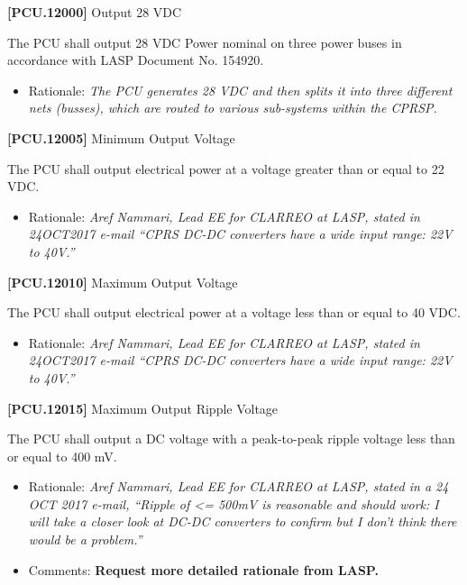 \textbf{[PCU.12000]} Output 28 \gls{VDC}

The \gls{PCU} shall output 28 \gls{VDC} Power nominal on three power buses in accordance with \gls{LASP} Document No. 154920.

\begin{itemize}
\item{} Rationale: \emph{The PCU generates 28 VDC and then splits it into three different nets (busses), which are routed to various sub-systems within the CPRSP.}

\end{itemize}

\textbf{[PCU.12005]} Minimum Output Voltage

The \gls{PCU} shall output electrical power at a voltage greater than or equal to 22 \gls{VDC}.

\begin{itemize}
\item{} Rationale: \emph{Aref Nammari, Lead EE for CLARREO at LASP, stated in 24OCT2017 e-mail ``CPRS DC-DC converters have a wide input range: 22V to 40V.''}

\end{itemize}

\textbf{[PCU.12010]} Maximum Output Voltage

The \gls{PCU} shall output electrical power at a voltage less than or equal to 40 \gls{VDC}.

\begin{itemize}
\item{} Rationale: \emph{Aref Nammari, Lead EE for CLARREO at LASP, stated in 24OCT2017 e-mail ``CPRS DC-DC converters have a wide input range: 22V to 40V.''}

\end{itemize}

\textbf{[PCU.12015]} Maximum Output Ripple Voltage

The \gls{PCU} shall output a DC voltage with a peak-to-peak ripple voltage less than or equal to 400 mV.

\begin{itemize}
\item{} Rationale: \emph{Aref Nammari, Lead EE for CLARREO at LASP, stated in a 24 OCT 2017 e-mail, ``Ripple of <= 500mV is reasonable and should work: I will take a closer look at DC-DC converters to confirm but I don't think there would be a problem.''}

\item{} Comments: \textbf{Request more detailed rationale from LASP.}

\end{itemize}

